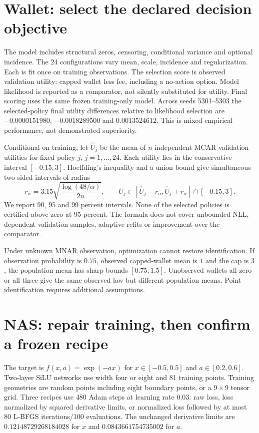 \section{Wallet: select the declared decision objective}
The model includes structural zeros, censoring, conditional variance and
optional incidence. The 24 configurations vary mean, scale, incidence and
regularization. Each is fit once on training observations. The selection score
is observed validation utility: capped wallet less fee, including a no-action
option. Model likelihood is reported as a comparator, not silently substituted
for utility. Final scoring uses the same frozen training-only model.
Across seeds 5301--5303 the selected-policy final utility differences relative
to likelihood selection are $-0.0000151980$, $-0.0018289500$ and $0.0013524612$.
This is mixed empirical performance, not demonstrated superiority.

Conditional on training, let $\widehat U_j$ be the mean of $n$ independent
MCAR validation utilities for fixed policy $j$, $j=1,\ldots,24$. Each utility
lies in the conservative interval $[-0.15,3]$. Hoeffding's inequality and a
union bound give simultaneous two-sided intervals of radius
\[
 r_\alpha=3.15\sqrt{\frac{\log(48/\alpha)}{2n}},\qquad
 U_j\in[\widehat U_j-r_\alpha,\widehat U_j+r_\alpha]\cap[-0.15,3].
\]
We report 90, 95 and 99 percent intervals. None of the selected policies is
certified above zero at 95 percent. The formula does not cover unbounded NLL,
dependent validation samples, adaptive refits or improvement over the comparator.

Under unknown MNAR observation, optimization cannot restore identification.
If observation probability is $0.75$, observed capped-wallet mean is $1$ and
the cap is $3$, the population mean has sharp bounds $[0.75,1.5]$.
Unobserved wallets all zero or all three give the same observed law but
different population means. Point identification requires additional assumptions.

\section{NAS: repair training, then confirm a frozen recipe}
The target is $f(x,a)=\exp(-ax)$ for $x\in[-0.5,0.5]$ and $a\in[0.2,0.6]$.
Two-layer SiLU networks use width four or eight and 81 training points.
Training geometries are random points including eight boundary points, or
a $9\times9$ tensor grid. Three recipes use 480 Adam steps at learning rate
$0.03$: raw loss, loss normalized by squared derivative limits, or normalized
loss followed by at most 80 L-BFGS iterations/100 evaluations.
The unchanged derivative limits are $0.12148729268184028$ for $x$ and
$0.0843661754735002$ for $a$.

